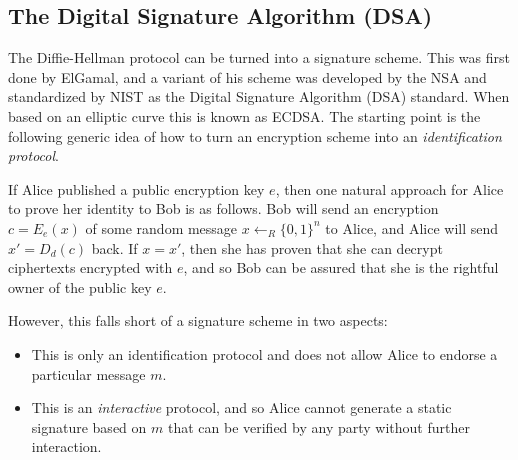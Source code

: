 \hypertarget{strongunforgabilitysigrem}{}

\subsection{The Digital Signature Algorithm
(DSA)}\label{10-The-Digital-Signature-}

The Diffie-Hellman protocol can be turned into a signature scheme. This
was first done by ElGamal, and a variant of his scheme was developed by
the NSA and standardized by NIST as the Digital Signature Algorithm
(DSA) standard. When based on an elliptic curve this is known as ECDSA.
The starting point is the following generic idea of how to turn an
encryption scheme into an \emph{identification protocol}.

If Alice published a public encryption key \(e\), then one natural
approach for Alice to prove her identity to Bob is as follows. Bob will
send an encryption \(c=E_e(x)\) of some random message
\(x \leftarrow_R \{0,1\}^n\) to Alice, and Alice will send \(x'=D_d(c)\)
back. If \(x=x'\), then she has proven that she can decrypt ciphertexts
encrypted with \(e\), and so Bob can be assured that she is the rightful
owner of the public key \(e\).

However, this falls short of a signature scheme in two aspects:

\begin{itemize}
\tightlist
\item
  This is only an identification protocol and does not allow Alice to
  endorse a particular message \(m\).\\
\item
  This is an \emph{interactive} protocol, and so Alice cannot generate a
  static signature based on \(m\) that can be verified by any party
  without further interaction.
\end{itemize}

